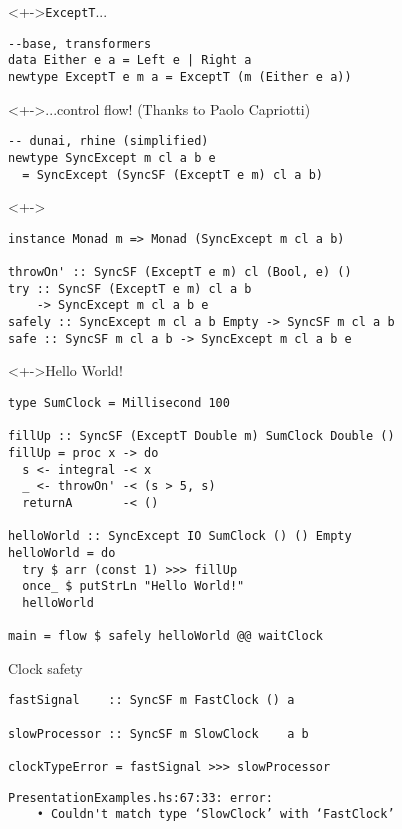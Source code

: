\documentclass[handout]{enigtex-beamer-base}
\begin{document}
\begin{frame}[fragile]
\begin{block}<+->{\texttt{ExceptT}...}
\begin{verbatim}
--base, transformers
data Either e a = Left e | Right a
newtype ExceptT e m a = ExceptT (m (Either e a))
\end{verbatim}
\end{block}

\begin{block}<+->{...control flow! (Thanks to Paolo Capriotti)}
\begin{verbatim}
-- dunai, rhine (simplified)
newtype SyncExcept m cl a b e
  = SyncExcept (SyncSF (ExceptT e m) cl a b)
\end{verbatim}
\end{block}

\begin{block}<+->{}
\begin{verbatim}
instance Monad m => Monad (SyncExcept m cl a b)

throwOn' :: SyncSF (ExceptT e m) cl (Bool, e) ()
try :: SyncSF (ExceptT e m) cl a b
    -> SyncExcept m cl a b e
safely :: SyncExcept m cl a b Empty -> SyncSF m cl a b
safe :: SyncSF m cl a b -> SyncExcept m cl a b e
\end{verbatim}
\end{block}
\end{frame}

\begin{frame}[fragile]
\begin{block}<+->{Hello World!}
\begin{verbatim}
type SumClock = Millisecond 100

fillUp :: SyncSF (ExceptT Double m) SumClock Double ()
fillUp = proc x -> do
  s <- integral -< x
  _ <- throwOn' -< (s > 5, s)
  returnA       -< ()

helloWorld :: SyncExcept IO SumClock () () Empty
helloWorld = do
  try $ arr (const 1) >>> fillUp
  once_ $ putStrLn "Hello World!"
  helloWorld

main = flow $ safely helloWorld @@ waitClock
\end{verbatim}
\end{block}
\end{frame}

\begin{frame}[fragile]
\begin{block}{Clock safety}
\begin{verbatim}
fastSignal    :: SyncSF m FastClock () a

slowProcessor :: SyncSF m SlowClock    a b

clockTypeError = fastSignal >>> slowProcessor
\end{verbatim}
\begin{verbatim}
PresentationExamples.hs:67:33: error:
    • Couldn't match type ‘SlowClock’ with ‘FastClock’
\end{verbatim}
\end{block}
\end{frame}
\end{document}
